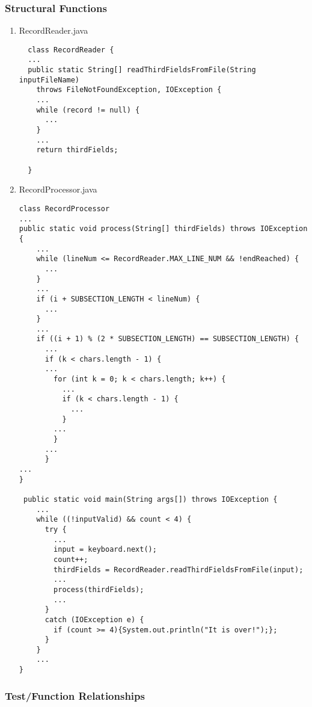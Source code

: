 \documentclass[]{article}
\begin{document}
\subsubsection{Structural Functions}
\label{sub:user_characteristics}

\begin{enumerate}
  \item RecordReader.java
  \begin{lstlisting}
  class RecordReader {
  ...
  public static String[] readThirdFieldsFromFile(String inputFileName)
    throws FileNotFoundException, IOException {
    ...
    while (record != null) {
      ...
    }
    ...
    return thirdFields;

  }
  \end{lstlisting} 

  \item RecordProcessor.java
\begin{lstlisting}
class RecordProcessor
...
public static void process(String[] thirdFields) throws IOException {
	...
	while (lineNum <= RecordReader.MAX_LINE_NUM && !endReached) {
      ...
    }
    ...
	if (i + SUBSECTION_LENGTH < lineNum) {
	  ...
	}
	...
	if ((i + 1) % (2 * SUBSECTION_LENGTH) == SUBSECTION_LENGTH) {
	  ...
	  if (k < chars.length - 1) {
	  ...
        for (int k = 0; k < chars.length; k++) {
          ...
          if (k < chars.length - 1) {
            ...
          }
        ...
	    }
	  ...
	  }
...
}

 public static void main(String args[]) throws IOException {
 	...
	while ((!inputValid) && count < 4) {
	  try {
		...
		input = keyboard.next();
        count++;
		thirdFields = RecordReader.readThirdFieldsFromFile(input);
		...
		process(thirdFields);
		...
	  }
	  catch (IOException e) {
	    if (count >= 4){System.out.println("It is over!");};
	  }
	}
	...
}
\end{lstlisting}
\end{enumerate}


\subsubsection{Test/Function Relationships}
\label{sub:user_characteristics}
\end{document}

